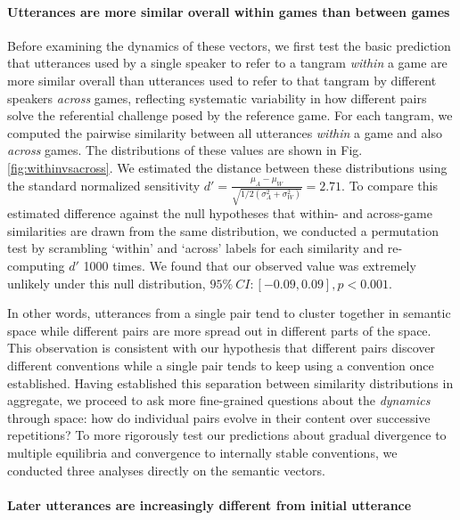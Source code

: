 \documentclass[alpha-refs]{wiley-article}
\begin{document}
\paragraph{Utterances are more similar overall within games than between games}  
Before examining the dynamics of these vectors, we first test the basic prediction that utterances used by a single speaker to refer to a tangram \emph{within} a game are more similar overall than utterances used to refer to that tangram by different speakers \emph{across} games, reflecting systematic variability in how different pairs solve the referential challenge posed by the reference game.
For each tangram, we computed the pairwise similarity between all utterances \emph{within} a game and also \emph{across} games. 
The distributions of these values are shown in Fig. \ref{fig:withinvsacross}.
We estimated the distance between these distributions using the standard normalized sensitivity $d' = \frac{\mu_A - \mu_W}{\sqrt{1/2(\sigma^2_A+\sigma^2_W)}} = 2.71$.
To compare this estimated difference against the null hypotheses that within- and across-game similarities are drawn from the same distribution, we conducted a permutation test by scrambling `within' and `across' labels for each similarity and re-computing $d'$ 1000 times. 
We found that our observed value was extremely unlikely under this null distribution, $95\%~CI: [-0.09, 0.09], p < 0.001$. 

In other words, utterances from a single pair tend to cluster together in semantic space while different pairs are more spread out in different parts of the space.
This observation is consistent with our hypothesis that different pairs discover different conventions while a single pair tends to keep using a convention once established.
Having established this separation between similarity distributions in aggregate, we proceed to ask more fine-grained questions about the \emph{dynamics} through space: how do individual pairs evolve in their content over successive repetitions?
To more rigorously test our predictions about gradual divergence to multiple equilibria and convergence to internally stable conventions, we conducted three analyses directly on the semantic vectors.

\paragraph{Later utterances are increasingly different from initial utterance}
\end{document}

